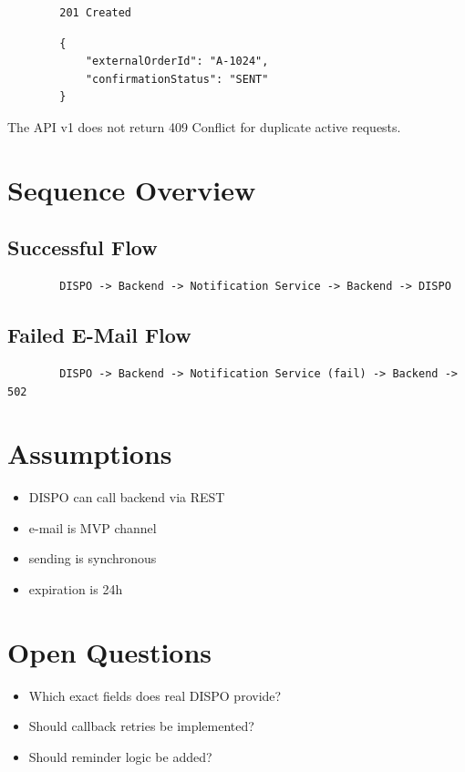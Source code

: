 \documentclass[a4paper,11pt]{article}
\begin{document}
	\begin{lstlisting}
		201 Created
	\end{lstlisting}
	
	\begin{lstlisting}
		{
			"externalOrderId": "A-1024",
			"confirmationStatus": "SENT"
		}
	\end{lstlisting}
	
	The API v1 does not return 409 Conflict for duplicate active requests.
	
	\section{Sequence Overview}
	
	\subsection{Successful Flow}
	
	\begin{lstlisting}
		DISPO -> Backend -> Notification Service -> Backend -> DISPO
	\end{lstlisting}
	
	\subsection{Failed E-Mail Flow}
	
	\begin{lstlisting}
		DISPO -> Backend -> Notification Service (fail) -> Backend -> 502
	\end{lstlisting}
	
	\section{Assumptions}
	
	\begin{itemize}
		\item DISPO can call backend via REST
		\item e-mail is MVP channel
		\item sending is synchronous
		\item expiration is 24h
	\end{itemize}
	
	\section{Open Questions}
	
	\begin{itemize}
		\item Which exact fields does real DISPO provide?
		\item Should callback retries be implemented?
		\item Should reminder logic be added?
	\end{itemize}
	
\end{document}

